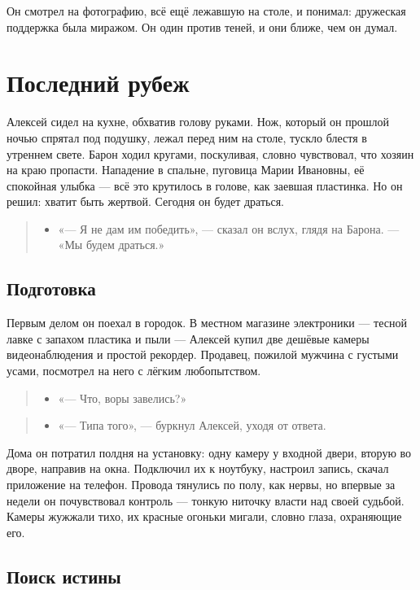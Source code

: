 \documentclass[12pt,a4paper]{book}
\newenvironment{dialogue}{\begin{quote}\itshape\begin{itemize}\item[]}{\end{itemize}\end{quote}}
\begin{document}
Он смотрел на фотографию, всё ещё лежавшую на столе, и понимал: дружеская поддержка была миражом. Он один против теней, и они ближе, чем он думал.

\chapter{Последний рубеж}

Алексей сидел на кухне, обхватив голову руками. Нож, который он прошлой ночью спрятал под подушку, лежал перед ним на столе, тускло блестя в утреннем свете. Барон ходил кругами, поскуливая, словно чувствовал, что хозяин на краю пропасти. Нападение в спальне, пуговица Марии Ивановны, её спокойная улыбка — всё это крутилось в голове, как заевшая пластинка. Но он решил: хватит быть жертвой. Сегодня он будет драться.

\begin{dialogue}
«— Я не дам им победить», — сказал он вслух, глядя на Барона. — «Мы будем драться.»
\end{dialogue}

\section{Подготовка}

Первым делом он поехал в городок. В местном магазине электроники — тесной лавке с запахом пластика и пыли — Алексей купил две дешёвые камеры видеонаблюдения и простой рекордер. Продавец, пожилой мужчина с густыми усами, посмотрел на него с лёгким любопытством.

\begin{dialogue}
«— Что, воры завелись?»
\end{dialogue}

\begin{dialogue}
«— Типа того», — буркнул Алексей, уходя от ответа.
\end{dialogue}

Дома он потратил полдня на установку: одну камеру у входной двери, вторую во дворе, направив на окна. Подключил их к ноутбуку, настроил запись, скачал приложение на телефон. Провода тянулись по полу, как нервы, но впервые за недели он почувствовал контроль — тонкую ниточку власти над своей судьбой. Камеры жужжали тихо, их красные огоньки мигали, словно глаза, охраняющие его.

\section{Поиск истины}
\end{document}
